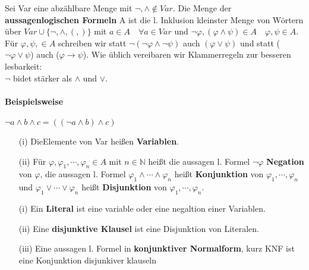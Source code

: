     Sei Var eine abzählbare Menge mit \(\lnot, \wedge \not \in Var\). Die Menge der \textbf{aussagenlogischen Formeln} A ist die l. Inklusion kleinster Menge von Wörtern über \(Var \cup \{\lnot, \wedge, (,)\}\) mit \(a \in A \quad \forall a \in Var\) und \(\lnot \varphi, (\varphi \wedge \psi) \in A \quad \varphi, \psi \in A\). Für \(\varphi, \psi, \in A\) schreiben wir statt \(\lnot(\lnot \varphi \wedge \lnot \psi)\) auch \((\varphi \vee \psi)\) und statt (\(\lnot \varphi \vee \psi\)) auch (\(\varphi \to \psi\)). Wie üblich vereibaren wir Klammerregeln zur besseren lesbarkeit: \\ \(\lnot\) bidet stärker als \(\wedge\) und \(\vee\). 
    \paragraph*{Beispielsweise}
        \(\lnot a \wedge b \wedge c = ((\lnot a \wedge b)\wedge c)\)
    
    \begin{itemize}
        \item [(i)]DieElemente von Var heißen \textbf{Variablen}.
        \item [(ii)] Für \(\varphi, \varphi_1, \cdots, \varphi_n \in A\) mit \(n \in \mathbb{N}\) heißt die aussagen l. Formel \( \lnot \varphi\) \textbf{Negation} von \(\varphi\), die aussagen l. Formel \(\varphi_1 \wedge \cdots \wedge \varphi_n\) heißt \textbf{Konjunktion} von \(\varphi_1, \cdots, \varphi_n\) und \(\varphi_1 \vee \cdots \vee \varphi_n\) heißt \textbf{Disjunktion} von \(\varphi_1, \cdots, \varphi_n\).
    \end{itemize}

\begin{itemize}
    \item [(i)] Ein \textbf{Literal} ist eine variable oder eine negaltion einer Variablen.
    \item [(ii)] Eine \textbf{disjunktive Klausel} ist eine Disjunktion von Literalen.
    \item [(iii)] Eine aussagen l. Formel in \textbf{konjunktiver Normalform}, kurz KNF ist eine Konjunktion disjunkiver klauseln
\end{itemize}

